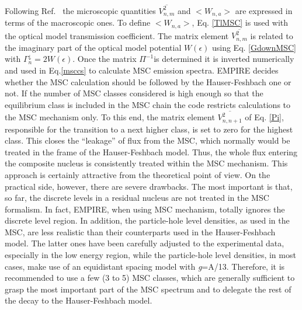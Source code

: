 \documentclass[twocolumn,amsmath,amssymb,10pt,groupedaddress,a4paper]{revtex4}
\begin{document}
Following Ref.~\cite{HRW} the microscopic quantities $\overline{V_{n,m}^{2}}$
and $<W_{n,a}>$ are expressed in terms of the macroscopic
ones. To define $<W_{n,a}>$,  Eq. \ref{TlMSC} is used with
 the optical model transmission coefficient. The matrix element
$\overline{V_{n,m}^{2}}$ is related to the imaginary part of the
optical model potential $W(\epsilon)$ using Eq. \ref{GdownMSC} with
$\Gamma_{n}^{\downarrow}=2W(\epsilon)$. Once the matrix $\Pi^{-1}$is determined it
is inverted numerically and used in Eq.\ref{msccs} to calculate MSC
emission spectra.
EMPIRE decides whether the MSC calculation should be followed by the
Hauser-Feshbach one or not. If the number
of MSC classes considered is high enough so that the equilibrium class
is included in the MSC chain the code restricts calculations to the
MSC mechanism only. To this end, the matrix element $\overline{V_{n,n+1}^{2}}$
of Eq. \ref{Pi}, responsible for the transition to a next higher
class, is set to zero for the highest class. This closes the {}``leakage''
of flux from the MSC, which normally would be treated in the frame
of the Hauser-Feshbach model. Thus, the whole
flux entering the composite nucleus is consistently treated within
the MSC mechanism. This approach is certainly attractive from the
theoretical point of view. On the practical side, however, there are
severe drawbacks. The most important is that, so far, the discrete
levels in a residual nucleus are not treated in the MSC
formalism. In fact, EMPIRE, when using MSC mechanism, totally ignores
the discrete level region. In addition, the particle-hole level densities,
as used in the MSC, are less realistic than their counterparts used
in the Hauser-Feshbach model. The latter ones
have been carefully adjusted to the experimental data, especially
in the low energy region, while the particle-hole level densities,
in most cases, make use of an equidistant spacing model with \emph{g}=A/13.
Therefore, it is recommended to use a few (3 to 5) MSC
classes, which are generally sufficient to grasp the most important
part of the MSC spectrum and to delegate the rest of the decay to
the Hauser-Feshbach model.
\end{document}
